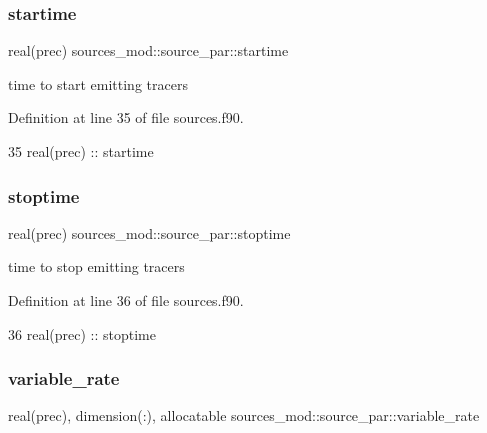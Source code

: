 \subsubsection{\texorpdfstring{startime}{startime}}
{\footnotesize\ttfamily real(prec) sources\+\_\+mod\+::source\+\_\+par\+::startime\hspace{0.3cm}{\ttfamily [private]}}



time to start emitting tracers 



Definition at line 35 of file sources.\+f90.


\begin{DoxyCode}
35         \textcolor{keywordtype}{real(prec)} :: startime
\end{DoxyCode}
\mbox{\label{structsources__mod_1_1source__par_ac5270ce3b0124a710527f4fa60ce30bc}} 
\subsubsection{\texorpdfstring{stoptime}{stoptime}}
{\footnotesize\ttfamily real(prec) sources\+\_\+mod\+::source\+\_\+par\+::stoptime\hspace{0.3cm}{\ttfamily [private]}}



time to stop emitting tracers 



Definition at line 36 of file sources.\+f90.


\begin{DoxyCode}
36         \textcolor{keywordtype}{real(prec)} :: stoptime
\end{DoxyCode}
\mbox{\label{structsources__mod_1_1source__par_ad5a8b90aed8636e98daafb1ede1390fd}} 
\subsubsection{\texorpdfstring{variable\+\_\+rate}{variable\_rate}}
{\footnotesize\ttfamily real(prec), dimension(\+:), allocatable sources\+\_\+mod\+::source\+\_\+par\+::variable\+\_\+rate\hspace{0.3cm}{\ttfamily [private]}}



